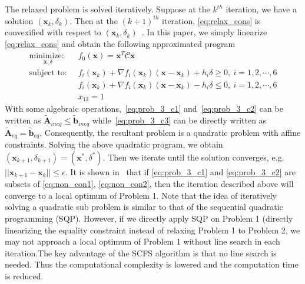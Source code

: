 The relaxed problem is solved iteratively. Suppose at the
$k^{th}$ iteration, we have a solution $(\mathbf{x}_{k}, \delta_k)$. Then at the $(k + 1)^{th}$ iteration, \eqref{eq:relax_cons} is convexified with respect to $(\mathbf{x}_{k}, \delta_k)$~\cite{liu2017real}. In this paper, we simply linearize \eqref{eq:relax_cons} and obtain the following approximated program
\begin{align}
\underset{\mathbf{x}, \delta}{\text{minimize: }}& \ f_0(\mathbf{x})=\mathbf{x}^T\mathcal{C}\mathbf{x}\\
\label{eq:prob_3_c1}
\text{subject to: }& \ f_i(\mathbf{x}_k) + \nabla f_i(\mathbf{x}_k)(\mathbf{x}-\mathbf{x}_k) + h_i\delta \geq 0,\ i=1,2,\cdots,6  \\
\label{eq:prob_3_c2}
& \ f_i(\mathbf{x}_k) + \nabla f_i(\mathbf{x}_k)(\mathbf{x}-\mathbf{x}_k) - h_i\delta \leq 0,\ i=1,2,\cdots,6  \\  
\label{eq:prob_3_c3}
& \ x_{13} = 1 
\end{align}
With some algebraic operations,~\eqref{eq:prob_3_c1} and~\eqref{eq:prob_3_c2} can be written as $\tilde{\mathbf{A}}_{ineq} \leq \tilde{\mathbf{b}}_{ineq}$ while~\eqref{eq:prob_3_c3} can be directly written as $\tilde{\mathbf{A}}_{eq} = \tilde{\mathbf{b}}_{eq}$. Consequently, the resultant problem is a quadratic problem with affine constraints. Solving the above quadratic program, we obtain $(\mathbf{x}_{k+1}, \delta_{k+1})=(\mathbf{x}^*, \delta^*)$. Then we iterate until the solution converges, e.g. $||\mathbf{x}_{k+1}-\mathbf{x}_k|| \leq \epsilon $. It is shown in~\cite{liu2017real} that if \eqref{eq:prob_3_c1} and \eqref{eq:prob_3_c2} are subsets of \eqref{eq:non_con1}, \eqref{eq:non_con2}, then the iteration described above will converge to
a local optimum of Problem 1. Note that the idea of iteratively solving a quadratic sub problem is similar to that of the sequential quadratic programming (SQP). However, if we directly apply SQP on Problem 1 (directly linearizing the equality constraint instead of relaxing Problem 1 to Problem 2, we may not approach a local optimum of Problem 1 without line search in each iteration.The key advantage of the SCFS algorithm is that no line search is needed. Thus the computational complexity is lowered and the computation time is reduced.

